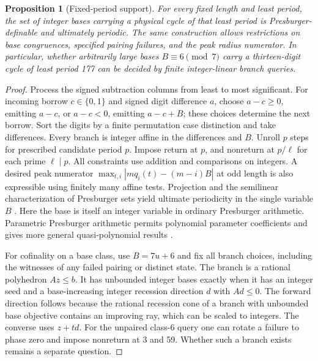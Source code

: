 \documentclass[11pt,reqno]{amsart}
\newtheorem{proposition}[theorem]{Proposition}
\theoremstyle{definition}
\begin{document}
\begin{proposition}[Fixed-period support]\label{prop:support}
For every fixed length and least period, the set of integer bases carrying a physical cycle of that least period is Presburger-definable and ultimately periodic. The same construction allows restrictions on base congruences, specified pairing failures, and the peak radius numerator. In particular, whether arbitrarily large bases \(B\equiv6\pmod7\) carry a thirteen-digit cycle of least period 177 can be decided by finite integer-linear branch queries.
\end{proposition}
\begin{proof}
Process the signed subtraction columns from least to most significant. For incoming borrow \(c\in\{0,1\}\) and signed digit difference \(a\), choose \(a-c\ge0\), emitting \(a-c\), or \(a-c<0\), emitting \(a-c+B\); these choices determine the next borrow. Sort the digits by a finite permutation case distinction and take differences. Every branch is integer affine in the differences and \(B\). Unroll \(p\) steps for prescribed candidate period \(p\). Impose return at \(p\), and nonreturn at \(p/\ell\) for each prime \(\ell\mid p\). All constraints use addition and comparisons on integers. A desired peak numerator \(\max_{t,i}|m q_i(t)-(m-i)B|\) at odd length is also expressible using finitely many affine tests. Projection and the semilinear characterization of Presburger sets yield ultimate periodicity in the single variable \(B\) \cite[Theorem~1.3]{GS}. Here the base is itself an integer variable in ordinary Presburger arithmetic. Parametric Presburger arithmetic permits polynomial parameter coefficients and gives more general quasi-polynomial results \cite[Theorem~1.15]{BGW}\cite[Theorems~1.2 and~1.5]{BGWS}.

For cofinality on a base class, use \(B=7u+6\) and fix all branch choices, including the witnesses of any failed pairing or distinct state. The branch is a rational polyhedron \(Az\le b\). It has unbounded integer bases exactly when it has an integer seed and a base-increasing integer recession direction \(d\) with \(Ad\le0\). The forward direction follows because the rational recession cone of a branch with unbounded base objective contains an improving ray, which can be scaled to integers. The converse uses \(z+td\). For the unpaired class-6 query one can rotate a failure to phase zero and impose nonreturn at 3 and 59. Whether such a branch exists remains a separate question.
\end{proof}
\end{document}
